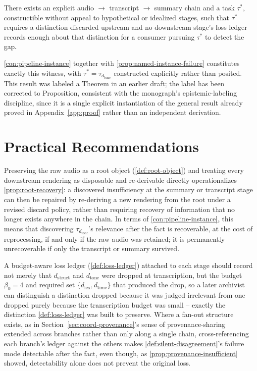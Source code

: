 \begin{proposition}
\label{prop:pipeline-witness}
There exists an explicit audio $\to$ transcript $\to$ summary chain and a
task $\tau^*$, constructible without appeal to hypothetical or idealized
stages, such that $\tau^*$ requires a distinction discarded upstream and
no downstream stage's loss ledger records enough about that distinction
for a consumer pursuing $\tau^*$ to detect the gap.
\end{proposition}

\begin{proofsketch}
\cref{con:pipeline-instance} together with
\cref{prop:named-instance-failure} constitutes exactly this witness, with
$\tau^* = \tau_{d_{\mathrm{tone}}}$ constructed explicitly rather than
posited. This result was labeled a Theorem in an earlier draft; the
label has been corrected to Proposition, consistent with the monograph's
epistemic-labeling discipline, since it is a single explicit
instantiation of the general result already proved in
Appendix~\ref{app:proof} rather than an independent derivation.
\end{proofsketch}

\section{Practical Recommendations}

Preserving the raw audio as a root object (\cref{def:root-object}) and
treating every downstream rendering as disposable and re-derivable
directly operationalizes \cref{prop:root-recovery}: a discovered
insufficiency at the summary or transcript stage can then be repaired by
re-deriving a new rendering from the root under a revised discard
policy, rather than requiring recovery of information that no longer
exists anywhere in the chain. In terms of \cref{con:pipeline-instance},
this means that discovering $\tau_{d_{\mathrm{tone}}}$'s relevance after
the fact is recoverable, at the cost of reprocessing, if and only if the
raw audio was retained; it is permanently unrecoverable if only the
transcript or summary survived.

A budget-aware loss ledger (\cref{def:loss-ledger}) attached to each
stage should record not merely that $d_{\mathrm{struct}}$ and
$d_{\mathrm{tone}}$ were dropped at transcription, but the budget
$\beta_0 = 4$ and required set $\{d_{\mathrm{lex}}, d_{\mathrm{time}}\}$
that produced the drop, so a later archivist can distinguish a
distinction dropped because it was judged irrelevant from one dropped
purely because the transcription budget was small -- exactly the
distinction \cref{def:loss-ledger} was built to preserve. Where a
fan-out structure exists, as in Section~\ref{sec:coord-provenance}'s
sense of provenance-sharing extended across branches rather than only
along a single chain, cross-referencing each branch's ledger against the
others makes \cref{def:silent-disagreement}'s failure mode detectable
after the fact, even though, as \cref{prop:provenance-insufficient}
showed, detectability alone does not prevent the original loss.
